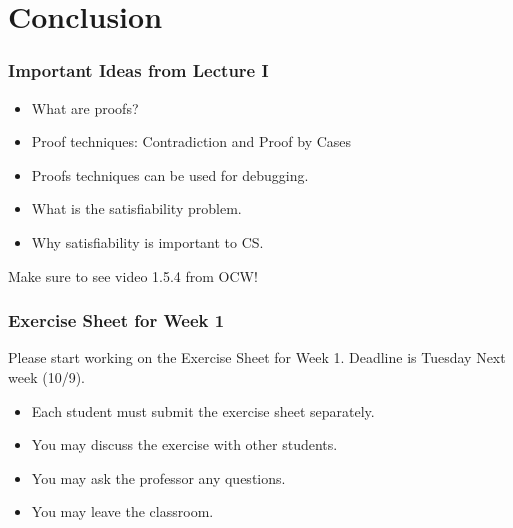 \documentclass{beamer}
\begin{document}
\section{Conclusion}
\begin{frame}
  \frametitle{Important Ideas from Lecture I}
  \begin{itemize}
  \item What are proofs?
  \item Proof techniques: Contradiction and Proof by Cases
  \item Proofs techniques can be used for debugging.
  \item What is the satisfiability problem.
  \item Why satisfiability is important to CS.
  \end{itemize}

  \bigskip
  
  Make sure to see video 1.5.4 from OCW!
\end{frame}

\begin{frame}
  \frametitle{Exercise Sheet for Week 1}

  Please start working on the Exercise Sheet for Week 1. Deadline is
  Tuesday Next week (10/9).

  \vfill
  
  \begin{itemize}
  \item Each student must submit the exercise sheet separately.
  \item You may discuss the exercise with other students.
  \item You may ask the professor any questions.
  \item You may leave the classroom.
  \end{itemize}
  
\end{frame}
\end{document}
